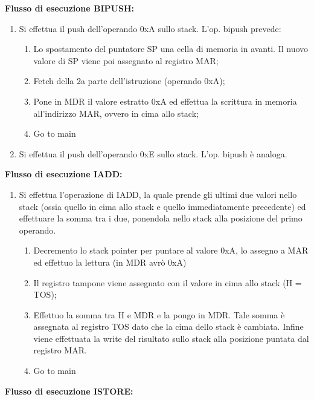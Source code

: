 \documentclass[12pt]{article}
\begin{document}
{\large \textbf{Flusso di esecuzione BIPUSH:}}
\begin{enumerate}[resume]
    \item Si effettua il push dell'operando 0xA sullo stack. L'op. bipush prevede:
          \begin{enumerate}
              \item Lo spostamento del puntatore SP una cella di memoria in avanti. Il nuovo valore di SP viene poi assegnato al registro MAR;
              \item Fetch della 2a parte dell'istruzione (operando 0xA);
              \item Pone in MDR il valore estratto 0xA ed effettua la scrittura in memoria all'indirizzo MAR, ovvero in cima allo stack;
              \item Go to main
          \end{enumerate}
    \item Si effettua il push dell'operando 0xE sullo stack. L'op. bipush è analoga.
\end{enumerate}
{\large \textbf{Flusso di esecuzione IADD:}}
\begin{enumerate}[resume]
    \item Si effettua l'operazione di IADD, la quale prende gli ultimi due valori nello stack (ossia quello in cima allo stack e quello immediatamente precedente) ed effettuare la somma tra i due, ponendola nello stack alla posizione del primo operando.
          \begin{enumerate}
              \item Decremento lo stack pointer per puntare al valore 0xA, lo assegno a MAR ed effettuo la lettura (in MDR avrò 0xA)
              \item Il registro tampone viene assegnato con il valore in cima allo stack (H = TOS);
              \item Effettuo la somma tra H e MDR e la pongo in MDR. Tale somma è assegnata al registro TOS dato che la cima dello stack è cambiata. Infine viene effettuata la write del risultato sullo stack alla posizione puntata dal registro MAR.
              \item Go to main
          \end{enumerate}
\end{enumerate}
{\large \textbf{Flusso di esecuzione ISTORE:}}
\end{document}
